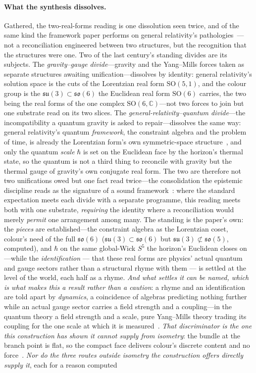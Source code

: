 \documentclass[11pt]{article}
\theoremstyle{plain}
\theoremstyle{remark}
\newcommand{\so}{\mathfrak{so}}
\newcommand{\su}{\mathfrak{su}}
\newcommand{\SO}{\mathrm{SO}}
\begin{document}
\paragraph{What the synthesis dissolves.} Gathered, the two-real-forms reading is one dissolution seen twice, and of the same kind the framework paper performs on general relativity's pathologies~\cite{JanzenCRframework}---not a reconciliation engineered between two structures, but the recognition that the structures were one. Two of the last century's standing divides are its subjects. The \emph{gravity--gauge divide}---gravity and the Yang--Mills forces taken as separate structures awaiting unification---dissolves by identity: general relativity's solution space is the cuts of the Lorentzian real form $\SO(5,1)$, and the colour group is the $\su(3)\subset\so(6)$ the Euclidean real form $\SO(6)$ carries, the two being the real forms of the one complex $\SO(6,\mathbb{C})$---not two forces to join but one substrate read on its two slices. The \emph{general-relativity--quantum divide}---the incompatibility a quantum gravity is asked to repair---dissolves the same way: general relativity's quantum \emph{framework}, the constraint algebra and the problem of time, is already the Lorentzian form's own symmetric-space structure~\cite{JanzenAlgebroid,JanzenCanonicalTime}, and only the quantum \emph{scale} $\hbar$ is set on the Euclidean face by the horizon's thermal state, so the quantum is not a third thing to reconcile with gravity but the thermal gauge of gravity's own conjugate real form. The two are therefore not two unifications owed but one fact read twice---the consolidation the epistemic discipline reads as the signature of a sound framework~\cite{JanzenShadowExistence}: where the standard expectation meets each divide with a separate programme, this reading meets both with one substrate, \emph{requiring} the identity where a reconciliation would merely \emph{permit} one arrangement among many. The standing is the paper's own: the \emph{pieces} are established---the constraint algebra as the Lorentzian coset, colour's need of the full $\so(6)$ ($\su(3)\subset\so(6)$ but $\su(3)\not\subset\so(5)$, computed), and $\hbar$ on the same global-Wick $S^{5}$ the horizon's Euclidean closes on---while the \emph{identification} --- that these real forms are physics' actual quantum and gauge sectors rather than a structural rhyme with them --- is settled at the level of the world, each half as a rhyme. \emph{And what settles it can be named, which is what makes this a result rather than a caution}: a rhyme and an identification are told apart by \emph{dynamics}, a coincidence of algebras predicting nothing further while an actual gauge sector carries a field strength and a coupling---in the quantum theory a field strength and a scale, pure Yang--Mills theory trading its coupling for the one scale at which it is measured~\cite{JanzenMatter}. \emph{That discriminator is the one this construction has shown it cannot supply from isometry}: the bundle at the branch point is flat, so the compact face delivers colour's discrete content and no force~\cite{JanzenMatter}. \emph{Nor do the three routes outside isometry the construction offers directly supply it}, each for a reason computed 
\end{document}
